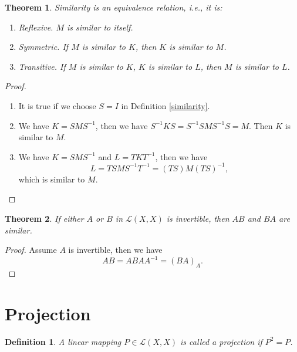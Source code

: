 \documentclass[10pt]{book}
\newtheorem{definition}{Definition}[chapter]
\newtheorem{theorem}{Theorem}[chapter]
\theoremstyle{definition}
\numberwithin{equation}{chapter}
\begin{document}
\begin{theorem}
Similarity is an equivalence relation, i.e., it is:
\begin{enumerate}[label=(\alph*)]
    \item Reflexive. $M$ is similar to itself.
    \item Symmetric. If $M$ is similar to $K$, then $K$ is similar to $M$.
    \item Transitive. If $M$ is similar to $K$, $K$ is similar to $L$, then $M$ is similar to $L$.
\end{enumerate}
\end{theorem}
\begin{proof}
~\begin{enumerate}[label=(\alph*)]
    \item It is true if we choose $S=I$ in Definition \ref{similarity}.
    \item We have $K = SMS^{-1}$, then we have $S^{-1}KS = S^{-1} S M S^{-1} S = M$. Then $K$ is similar to $M$.
    \item We have $K = SMS^{-1}$ and $L=TKT^{-1}$, then we have $$L = TSMS^{-1}T^{-1} = (TS)M(TS)^{-1},$$ which is similar to $M$.
\end{enumerate}
\end{proof}

\medskip

\begin{theorem}
If either $A$ or $B$ in $\mathscr{L}(X,X)$ is invertible, then $AB$ and $BA$ are similar.
\end{theorem}
\begin{proof}
Assume $A$ is invertible, then we have 
$$AB = ABAA^{-1} = (BA)_A.$$
\end{proof}

\medskip

\section{Projection}
\begin{definition}
A linear mapping $P\in \mathscr{L}(X,X)$ is called a projection if $P^2=P$.
\end{definition}

\medskip
\end{document}

